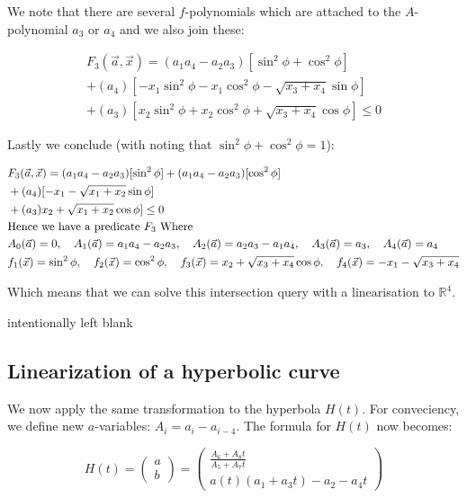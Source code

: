 \documentclass{article}
\begin{document}
We note that there are several $f$-polynomials which are attached to the $A$-polynomial $a_3$ or $a_4$ and we also join these: 

\begin{align*}
    F_3(\vec{a}, \vec{x}) = (a_1 a_4 - a_2 a_3)[\sin^2 \phi + \cos^2 \phi]  \\
    + (a_4) [- x_1 \sin^2 \phi - x_1 \cos^2 \phi -\sqrt{x_3 + x_4}\sin \phi ]  \\  + (a_3)[x_2 \sin^2 \phi + x_2\cos^2 \phi+ \sqrt{x_3 + x_4}\cos \phi]  \le 0
\end{align*}

Lastly we conclude (with noting that $\sin^2 \phi + \cos^2 \phi = 1$):

\begin{align*}
    &F_3(\vec{a}, \vec{x}) = (a_1 a_4 - a_2 a_3)[\sin^2 \phi] + (a_1 a_4 - a_2a_3)[\cos^2 \phi]  \\
    &+ (a_4) [- x_1 -\sqrt{x_1 + x_2}\sin \phi ]  \\  
    &+ (a_3)x_2 + \sqrt{x_1 + x_2}\cos \phi]  \le 0 \\
      &\textnormal{Hence we have a predicate } F_3 \textnormal{ Where } \\
    &A_0(\vec{a}) = 0, \quad A_1(\vec{a}) = a_1 a_4 - a_2 a_3,\quad A_2(\vec{a}) = a_2 a_3 - a_1 a_4,\quad A_3(\vec{a}) = a_3, \quad  A_4(\vec{a})= a_4\\
    &f_1(\vec{x}) = \sin^2 \phi,\quad f_2(\vec{x}) = \cos^2 \phi, \quad f_3(\vec{x}) = x_2 + \sqrt{x_3 + x_4}\cos \phi, \quad f_4(\vec{x}) = -x_1-\sqrt{x_3 + x_4}
\end{align*}

Which means that we can solve this intersection query with a linearisation to $\mathbb{R}^4$.
\newpage 

intentionally left blank

\newpage
\subsection{Linearization of a hyperbolic curve}

We now apply the same transformation to the hyperbola $H(t)$. For conveciency, we define new $a$-variables:
$A_i = a_i - a_{i-4}$.
The formula for $H(t)$ now becomes:

\begin{equation}
  H(t) = \left( \begin{array}{c}
         a  \\
         b 
    \end{array}  \right) =  
        \left( \begin{array}{c}
         \frac{ A_6 + A_8 t}
      { A_5  + A_7 t } \\
         a(t)(a_1 +  a_3 t) - a_2 -  a_4 t 
    \end{array}  \right)
\end{equation}
\end{document}
